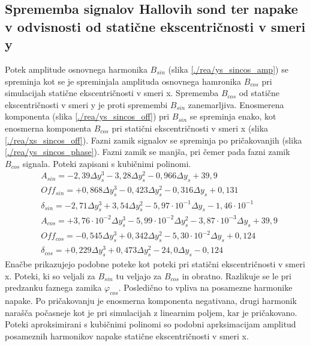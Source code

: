 \subsection{Sprememba signalov Hallovih sond ter napake v odvisnosti od statične ekscentričnosti v smeri y}
Potek amplitude osnovnega harmonika $B_{sin}$ (slika \ref{./rea/ys_sincos_amp}) se spreminja kot se je spreminjala amplituda osnovnega hamronika $B_{cos}$ pri simulacijah statične ekscentričnosti v smeri x. Sprememba $B_{cos}$ od statične ekscentričnosti v smeri y je proti spremembi $B_{sin}$ zanemarljiva. Enosmerena komponenta (slika \ref{./rea/ys_sincos_off}) pri $B_{sin}$ se spreminja enako, kot enosmerna komponenta $B_{cos}$ pri statični ekscentričnosti v smeri x (slika \ref{./rea/xs_sincos_off}).  Fazni zamik signalov se spreminja po pričakovanjih (slika \ref{./rea/ys_sincos_phase}). Fazni zamik se manjša, pri čemer pada fazni zamik $B_{cos}$ signala.
Poteki zapisani s kubičnimi polinomi.
\begin{eqnarray}
&A_{sin} = -2,39\Delta y_s^3-3,28\Delta y_s^2-0,966\Delta y_s+39,9\\     
&Off_{sin} = +0,868\Delta y_s^3-0,423\Delta y_s^2-0,316\Delta y_s+0,131\\   
&\delta_{sin} = -2,71\Delta y_s^3+3,54\Delta y_s^2-5,97\cdot 10^{-1}\Delta y_s-1,46\cdot 10^{-1}\\
&A_{cos} = +3,76\cdot 10^{-2}\Delta y_s^3-5,99\cdot 10^{-2}\Delta y_s^2-3,87\cdot 10^{-3}\Delta y_s+39,9\\     
&Off_{cos} = -0,545\Delta y_s^3+0,342\Delta y_s^2-5,30\cdot 10^{-2}\Delta y_s+0,124\\   
&\delta_{cos} = +0,229\Delta y_s^3+0,473\Delta y_s^2-24,0\Delta y_s-0,124  
\end{eqnarray}
Enačbe prikazujejo podobne poteke kot poteki pri statični ekscentričnosti v smeri x. Poteki, ki so veljali za $B_{sin}$ tu veljajo za $B_{cos}$ in obratno. Razlikuje se le pri predzanku faznega zamika $\varphi_{cos}$. 
Posledično to vpliva na posamezne harmonike napake. Po pričakovanju je enosmerna komponenta negativana, drugi harmonik narašča počasneje kot je pri simulacijah z linearnim poljem, kar je pričakovano. Poteki aproksimirani s kubičnimi polinomi so podobni aprksimacijam amplitud posameznih harmonikov napake statične ekscentričnosti v smeri x.
